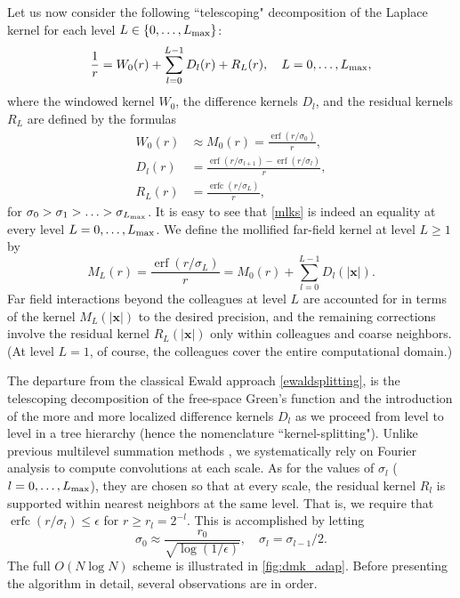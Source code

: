 \documentclass[final,letterpaper]{siamart171218}
\DeclareMathOperator\erf{erf}
\DeclareMathOperator\erfc{erfc}
\newcommand{\be}{\begin{equation}}
\newcommand{\ee}{\end{equation}}
\newcommand{\ba}{\begin{aligned}}
\newcommand{\ea}{\end{aligned}}
\newcommand{\x}{\boldsymbol{x}}
\newcommand{\cR}{r}
\begin{document}
Let us now consider the following 
``telescoping" decomposition of the Laplace kernel {for each level}
$L\in \{ 0,\dots,L_{\rm max} \}$:
\be\label{mlks}
\frac{1}{r} = W_0(r)+\sum_{l=0}^{L-1}D_{l}(r)+R_L(r), \quad 
L=0,\ldots,L_{\rm max},
\ee
where 
the windowed kernel $W_0$, the difference kernels $D_l$, and the 
residual kernels $R_L$
are defined by the formulas
\be\label{kerneldef}
\ba
W_0(r)&\approx M_0(r) = \frac{\erf(r/\sigma_0)}{r}, \\
D_l(r)&=\frac{\erf(r/\sigma_{l+1})-\erf(r/\sigma_{l})}{r},\\
R_L(r)&=\frac{\erfc(r/\sigma_L)}{r},
\ea
\ee
for $\sigma_0 > \sigma_1 > \ldots > \sigma_{L_{\rm max}}$.
It is easy to see that \cref{mlks} is indeed an equality at every level
$L = 0,\ldots,L_{\rm max}$. We
define the mollified far-field kernel at level $L\geq 1$ by
\be\label{windowedkernelL}
M_L(r) = \frac{\erf(r/\sigma_L)}{r} =
M_0(r)+\sum_{l=0}^{L-1}D_{l}(|\x|).
\ee
Far field interactions beyond 
the colleagues at level $L$ 
are accounted for in terms of the kernel $M_L(|\x|)$
to the desired precision, and the remaining
corrections involve the residual kernel $R_L(|\x|)$ only within colleagues
and coarse neighbors. (At level $L=1$, of course, the colleagues
cover the entire computational
domain.)

The departure from the classical Ewald approach
\eqref{ewaldsplitting},
is the telescoping decomposition of the free-space Green's function 
and the introduction of the more and more localized
difference kernels $D_l$ as we proceed from level to level in a tree hierarchy 
(hence the nomenclature ``kernel-splitting").
Unlike previous multilevel summation methods 
\cite{brandt1990jcp,brandt1998,skeel2002,hardy2009pc,multilevel_summation_2015,
multilevel_summation_bspline,tensor_multilevel_ewald},
we systematically rely on Fourier analysis to compute convolutions at each scale. 
As for the values  of $\sigma_l$ ($l=0,\ldots,L_{\rm max}$), they are chosen so that
at every scale, the residual kernel $R_l$ is supported within nearest neighbors at the
same level. That is,
we require that $\erfc(r/\sigma_l) \le \epsilon$
for $r\ge \cR_l=2^{-l}$. This is accomplished by letting
\be\label{deltavalue}
\sigma_0 \approx \frac{\cR_0}{\sqrt{\log(1/\epsilon)}},\quad
\sigma_l = \sigma_{l-1}/2. 
\ee
The full $O(N \log N)$ scheme is illustrated in \cref{fig:dmk_adap}.
Before presenting the algorithm in detail, several observations are in order.
\end{document}
